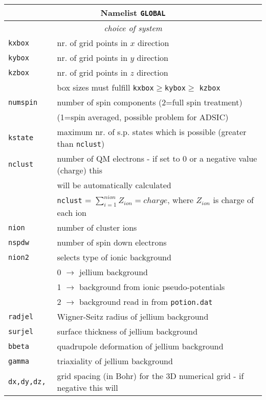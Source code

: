 \documentclass[12pt]{article}
\begin{document}
\begin{tabular}{ll}
\hline
\multicolumn{2}{c}{Namelist {\tt GLOBAL}} in {\tt for005.<name>} \\
\hline
\multicolumn{2}{c}{\it choice of system} \\
\hline
{\tt kxbox            }& nr. of grid points in $x$ direction\\
{\tt kybox            }& nr. of grid points in $y$ direction\\
{\tt kzbox            }& nr. of grid points in $z$ direction\\
& box sizes must fulfill {\tt kxbox}$\geq${\tt kybox}$\geq$ {\tt kzbox}\\
{\tt numspin}          & number of spin components (2=full spin treatment)\\
                       & (1=spin averaged, possible problem for ADSIC)\\
{\tt kstate           }& maximum nr. of s.p. states which is possible (greater than {\tt nclust})\\
{\tt nclust           }& number of QM electrons - if set to 0 or a negative value (charge) this \\
&will be automatically calculated\\
& {\tt nclust} = $\sum_{i=1}^{nion} Z_{ion} = charge$, where $Z_{ion}$ is charge of each ion\\
{\tt nion             }& number of cluster ions\\
{\tt nspdw            }& number of spin down electrons \\
{\tt nion2            }& selects type of ionic background \\
                       &  0 $\rightarrow$ jellium background \\
                       &  1 $\rightarrow$ background from ionic pseudo-potentials\\
                       &  2 $\rightarrow$ background read in from {\tt potion.dat}\\
{\tt radjel           }& Wigner-Seitz radius of jellium background\\
{\tt surjel         }& surface thickness of jellium background\\
{\tt bbeta         }& quadrupole deformation of jellium background\\
{\tt gamma         }& triaxiality of jellium background\\
{\tt dx,dy,dz,        }& grid spacing (in  Bohr) for the 3D numerical grid - if negative this will \\

\end{tabular}
\end{document}

